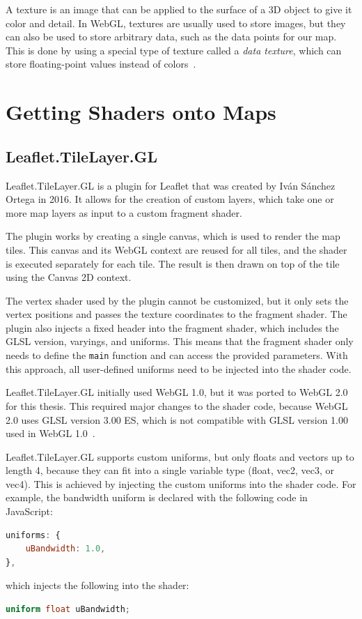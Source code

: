 A texture is an image that can be applied to the surface of a 3D object to give it color and detail. In WebGL, textures are usually used to store images, but they can also be used to store arbitrary data, such as the data points for our map. This is done by using a special type of texture called a \emph{data texture}, which can store floating-point values instead of colors\ \cite{webgl:mdn}.

\section{Getting Shaders onto Maps}

\subsection{Leaflet.TileLayer.GL}

Leaflet.TileLayer.GL is a plugin for Leaflet that was created by Iván Sánchez Ortega in 2016. It allows for the creation of custom layers, which take one or more map layers as input to a custom fragment shader.\ \cite{leaflet:tilelayergl}

The plugin works by creating a single canvas, which is used to render the map tiles. This canvas and its WebGL context are reused for all tiles, and the shader is executed separately for each tile. The result is then drawn on top of the tile using the Canvas 2D context.\ \cite{mdn:canvas2d}

The vertex shader used by the plugin cannot be customized, but it only sets the vertex positions and passes the texture coordinates to the fragment shader. The plugin also injects a fixed header into the fragment shader, which includes the GLSL version, varyings, and uniforms. This means that the fragment shader only needs to define the \verb|main| function and can access the provided parameters. With this approach, all user-defined uniforms need to be injected into the shader code.

Leaflet.TileLayer.GL initially used WebGL 1.0, but it was ported to WebGL 2.0 for this thesis. This required major changes to the shader code, because WebGL 2.0 uses GLSL version 3.00 ES, which is not compatible with GLSL version 1.00 used in WebGL 1.0\ \cite{webgl:2fundamentals}.

Leaflet.TileLayer.GL supports custom uniforms, but only floats and vectors up to length 4, because they can fit into a single variable type (float, vec2, vec3, or vec4). This is achieved by injecting the custom uniforms into the shader code. For example, the bandwidth uniform is declared with the following code in JavaScript:
\begin{lstlisting}[language=JavaScript,caption=Injecting Custom Uniforms into the Shader]
uniforms: {
    uBandwidth: 1.0,
},
\end{lstlisting}
which injects the following into the shader:
\begin{lstlisting}[language=GLSL]
uniform float uBandwidth;
\end{lstlisting}

